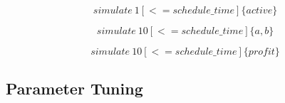 \begin{equation} \label{eq:smc4}
	simulate\ 1 [<=schedule\_time] \{ active\}
\end{equation}

\begin{equation} \label{eq:smc5}
	simulate\ 10 [<=schedule\_time] \{ a, b\}
\end{equation}

\begin{equation} \label{eq:smc6}
	simulate\ 10 [<= schedule\_time] \{ profit \}
\end{equation}




\subsection{Parameter Tuning}